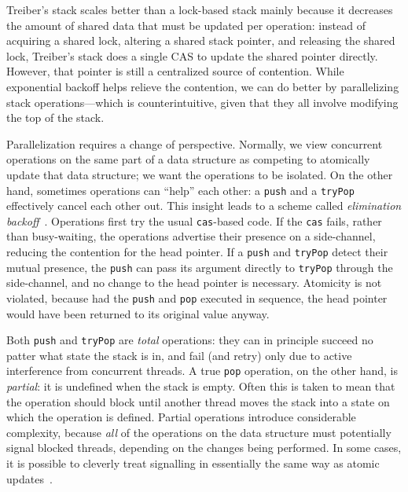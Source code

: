 \documentclass[preprint]{sigplanconf}
\begin{document}


Treiber's stack scales better than a lock-based stack mainly because it
decreases the amount of shared data that must be updated per operation: instead
of acquiring a shared lock, altering a shared stack pointer, and releasing the
shared lock, Treiber's stack does a single CAS to update the shared pointer
directly.  However, that pointer is still a centralized source of contention.
While exponential backoff helps relieve the contention, we can do better by
parallelizing stack operations---which is counterintuitive, given that they all
involve modifying the top of the stack.

Parallelization requires a change of perspective.  Normally, we view concurrent
operations on the same part of a data structure as competing to atomically
update that data structure; we want the operations to be isolated.  On the other
hand, sometimes operations can ``help'' each other: a \lstinline{push} and a
\lstinline{tryPop} effectively cancel each other out.  This insight leads to a
scheme called \emph{elimination backoff}~\cite{?}.  Operations first try the
usual \lstinline{cas}-based code.  If the \lstinline{cas} fails, rather than
busy-waiting, the operations advertise their presence on a side-channel,
reducing the contention for the head pointer.  If a \lstinline{push} and
\lstinline{tryPop} detect their mutual presence, the \lstinline{push} can pass
its argument directly to \lstinline{tryPop} through the side-channel, and no
change to the head pointer is necessary.  Atomicity is not violated, because had
the \lstinline{push} and \lstinline{pop} executed in sequence, the head pointer
would have been returned to its original value anyway.

Both \lstinline{push} and \lstinline{tryPop} are \emph{total} operations: they
can in principle succeed no patter what state the stack is in, and fail (and
retry) only due to active interference from concurrent threads.  A true
\lstinline{pop} operation, on the other hand, is \emph{partial}: it is undefined
when the stack is empty.  Often this is taken to mean that the operation should
block until another thread moves the stack into a state on which the operation
is defined.  Partial operations introduce considerable complexity, because
\emph{all} of the operations on the data structure must potentially signal
blocked threads, depending on the changes being performed.  In some cases, it is
possible to cleverly treat signalling in essentially the same way as atomic
updates~\cite{?}.
\end{document}
